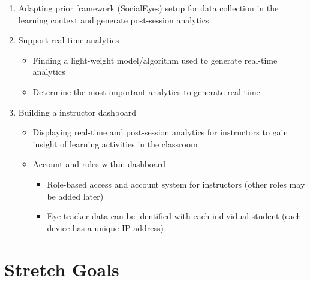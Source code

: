 \documentclass{article}
\begin{document}
  \begin{enumerate}
  \item Adapting prior framework (SocialEyes) setup for data collection in the learning context and generate post-session analytics
  \item Support real-time analytics 
    \begin{itemize}
        \item Finding a light-weight model/algorithm used to generate real-time analytics
        \item Determine the most important analytics to generate real-time
    \end{itemize}
    \item Building a instructor dashboard
        \begin{itemize}
            \item Displaying real-time and post-session analytics for instructors to gain insight of learning activities in the classroom
               \item Account and roles within dashboard
                    \begin{itemize}
                        \item Role-based access and account system for instructors (other roles may be added later)
                        \item Eye-tracker data can be identified with each individual student (each device has a unique IP address)
                    \end{itemize}
        \end{itemize}
  \end{enumerate}

\section{Stretch Goals}
\end{document}
